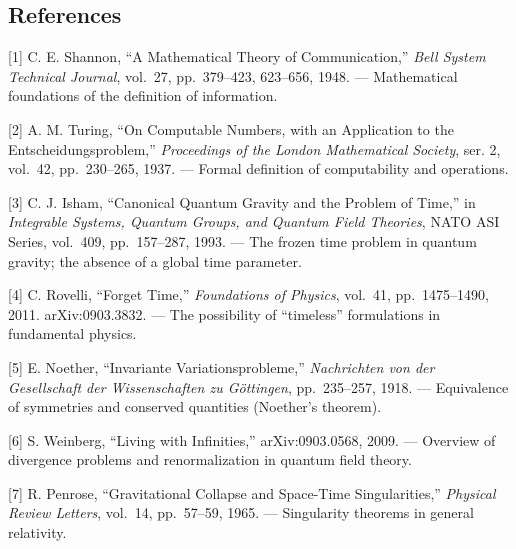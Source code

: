 \documentclass[a4paper,11pt]{article}
\begin{document}
\subsection{References}\label{references}

{[}1{]} C. E. Shannon, ``A Mathematical Theory of Communication,''
\emph{Bell System Technical Journal}, vol.~27, pp.~379--423, 623--656,
1948. --- Mathematical foundations of the definition of information.

{[}2{]} A. M. Turing, ``On Computable Numbers, with an Application to
the Entscheidungsproblem,'' \emph{Proceedings of the London Mathematical
Society}, ser. 2, vol.~42, pp.~230--265, 1937. --- Formal definition of
computability and operations.

{[}3{]} C. J. Isham, ``Canonical Quantum Gravity and the Problem of
Time,'' in \emph{Integrable Systems, Quantum Groups, and Quantum Field
Theories}, NATO ASI Series, vol.~409, pp.~157--287, 1993. --- The frozen
time problem in quantum gravity; the absence of a global time parameter.

{[}4{]} C. Rovelli, ``Forget Time,'' \emph{Foundations of Physics},
vol.~41, pp.~1475--1490, 2011. arXiv:0903.3832. --- The possibility of
``timeless'' formulations in fundamental physics.

{[}5{]} E. Noether, ``Invariante Variationsprobleme,'' \emph{Nachrichten
von der Gesellschaft der Wissenschaften zu Göttingen}, pp.~235--257,
1918. --- Equivalence of symmetries and conserved quantities (Noether's
theorem).

{[}6{]} S. Weinberg, ``Living with Infinities,'' arXiv:0903.0568, 2009.
--- Overview of divergence problems and renormalization in quantum field
theory.

{[}7{]} R. Penrose, ``Gravitational Collapse and Space-Time
Singularities,'' \emph{Physical Review Letters}, vol.~14, pp.~57--59,
1965. --- Singularity theorems in general relativity.
\end{document}
